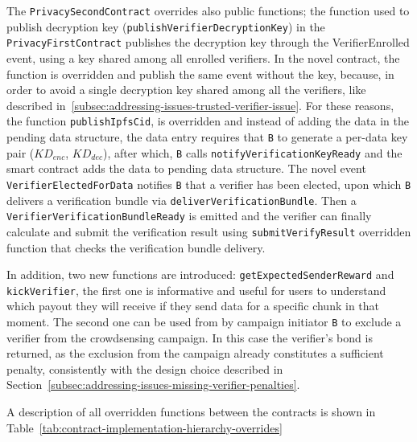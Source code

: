 The \texttt{PrivacySecondContract} overrides also public functions; the function used to publish decryption key (\texttt{publishVerifierDecryptionKey}) in the \texttt{PrivacyFirstContract} publishes the decryption key through the VerifierEnrolled event, using a key shared among all enrolled verifiers.
In the novel contract, the function is overridden and publish the same event without the key, because, in order to avoid a single decryption key shared among all the verifiers, like described in~\ref{subsec:addressing-issues-trusted-verifier-issue}.
For these reasons, the function \texttt{publishIpfsCid}, is overridden and instead of adding the data in the pending data structure, the data entry requires that \texttt{B} to generate a per-data key pair ($KD_{enc}$, $KD_{dec}$), after which, \texttt{B} calls \texttt{notifyVerificationKeyReady} and the smart contract adds the data to pending data structure.
The novel event \texttt{VerifierElectedForData} notifies \texttt{B} that a verifier has been elected, upon which \texttt{B} delivers a verification bundle via \texttt{deliverVerificationBundle}.
Then a \texttt{VerifierVerificationBundleReady} is emitted and the verifier can finally calculate and submit the verification result using \texttt{submitVerifyResult} overridden function that checks the verification bundle delivery.

In addition, two new functions are introduced: \texttt{getExpectedSenderReward} and \texttt{kickVerifier}, the first one is informative and useful for users to understand which payout they will receive if they send data for a specific chunk in that moment.
The second one can be used from by campaign initiator \texttt{B} to exclude a verifier from the crowdsensing campaign.
In this case the verifier's bond is returned, as the exclusion from the campaign already constitutes a sufficient penalty, consistently with the design choice described in Section~\ref{subsec:addressing-issues-missing-verifier-penalties}.

A description of all overridden functions between the contracts is shown in Table~\ref{tab:contract-implementation-hierarchy-overrides}

